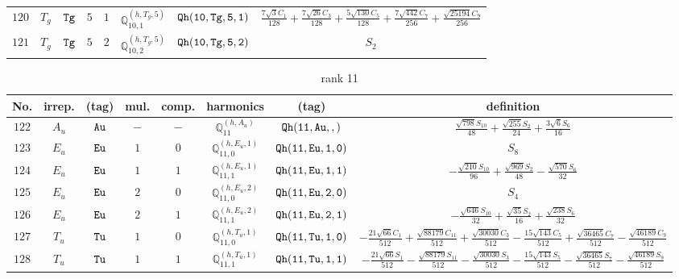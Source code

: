 \documentclass[fleqn,8pt]{jsarticle}
\begin{document}
\begin{table}[ht!]
\begin{center}
\begin{tabular}{cccccccc}
$ 120 $ & $ T_{g} $ & $ {\tt Tg} $ & $ 5 $ & $ 1 $ & $ \mathbb{Q}_{10,1}^{(h,T_{g},5)} $ & $ {\tt Qh(10,Tg,5,1)} $ & $ \frac{7 \sqrt{3} C_{1}}{128} + \frac{7 \sqrt{26} C_{3}}{128} + \frac{5 \sqrt{130} C_{5}}{128} + \frac{7 \sqrt{442} C_{7}}{256} + \frac{\sqrt{25194} C_{9}}{256} $ \\
$ 121 $ & $ T_{g} $ & $ {\tt Tg} $ & $ 5 $ & $ 2 $ & $ \mathbb{Q}_{10,2}^{(h,T_{g},5)} $ & $ {\tt Qh(10,Tg,5,2)} $ & $ S_{2} $ \\
 \hline \hline
\end{tabular}
\end{center}
\end{table}
\begin{table}[ht!]
\begin{center}
\caption{rank 11}
\renewcommand{\arraystretch}{1.3}
\begin{tabular}{cccccccc} \hline \hline
No. & irrep. & (tag) & mul. & comp. & harmonics & (tag) & definition \\ \hline
$ 122 $ & $ A_{u} $ & $ {\tt Au} $ & $ - $ & $ - $ & $ \mathbb{Q}_{11}^{(h,A_{u})} $ & $ {\tt Qh(11,Au,,)} $ & $ \frac{\sqrt{798} S_{10}}{48} + \frac{\sqrt{255} S_{2}}{24} + \frac{3 \sqrt{6} S_{6}}{16} $ \\
$ 123 $ & $ E_{u} $ & $ {\tt Eu} $ & $ 1 $ & $ 0 $ & $ \mathbb{Q}_{11,0}^{(h,E_{u},1)} $ & $ {\tt Qh(11,Eu,1,0)} $ & $ S_{8} $ \\
$ 124 $ & $ E_{u} $ & $ {\tt Eu} $ & $ 1 $ & $ 1 $ & $ \mathbb{Q}_{11,1}^{(h,E_{u},1)} $ & $ {\tt Qh(11,Eu,1,1)} $ & $ - \frac{\sqrt{210} S_{10}}{96} + \frac{\sqrt{969} S_{2}}{48} - \frac{\sqrt{570} S_{6}}{32} $ \\
$ 125 $ & $ E_{u} $ & $ {\tt Eu} $ & $ 2 $ & $ 0 $ & $ \mathbb{Q}_{11,0}^{(h,E_{u},2)} $ & $ {\tt Qh(11,Eu,2,0)} $ & $ S_{4} $ \\
$ 126 $ & $ E_{u} $ & $ {\tt Eu} $ & $ 2 $ & $ 1 $ & $ \mathbb{Q}_{11,1}^{(h,E_{u},2)} $ & $ {\tt Qh(11,Eu,2,1)} $ & $ - \frac{\sqrt{646} S_{10}}{32} + \frac{\sqrt{35} S_{2}}{16} + \frac{\sqrt{238} S_{6}}{32} $ \\
$ 127 $ & $ T_{u} $ & $ {\tt Tu} $ & $ 1 $ & $ 0 $ & $ \mathbb{Q}_{11,0}^{(h,T_{u},1)} $ & $ {\tt Qh(11,Tu,1,0)} $ & $ - \frac{21 \sqrt{66} C_{1}}{512} + \frac{\sqrt{88179} C_{11}}{512} + \frac{\sqrt{30030} C_{3}}{512} - \frac{15 \sqrt{143} C_{5}}{512} + \frac{\sqrt{36465} C_{7}}{512} - \frac{\sqrt{46189} C_{9}}{512} $ \\
$ 128 $ & $ T_{u} $ & $ {\tt Tu} $ & $ 1 $ & $ 1 $ & $ \mathbb{Q}_{11,1}^{(h,T_{u},1)} $ & $ {\tt Qh(11,Tu,1,1)} $ & $ - \frac{21 \sqrt{66} S_{1}}{512} - \frac{\sqrt{88179} S_{11}}{512} - \frac{\sqrt{30030} S_{3}}{512} - \frac{15 \sqrt{143} S_{5}}{512} - \frac{\sqrt{36465} S_{7}}{512} - \frac{\sqrt{46189} S_{9}}{512} $ \\

\end{tabular}
\end{center}
\end{table}
\end{document}
